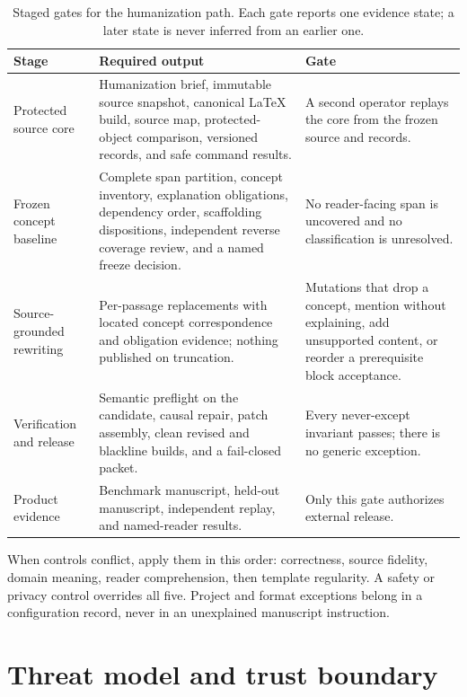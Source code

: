 \begin{table}[H]
\centering
\small
\begin{tabularx}{\textwidth}{@{}p{}L p{0.24\textwidth}@{}}
\toprule
Stage & Required output & Gate \\
\midrule
Protected source core & Humanization brief, immutable source snapshot, canonical
LaTeX build, source map, protected-object comparison, versioned records, and safe
command results. & A second operator replays the core from the frozen source and
records. \\
Frozen concept baseline & Complete span partition, concept inventory, explanation
obligations, dependency order, scaffolding dispositions, independent reverse
coverage review, and a named freeze decision. & No reader-facing span is
uncovered and no classification is unresolved. \\
Source-grounded rewriting & Per-passage replacements with located concept
correspondence and obligation evidence; nothing published on truncation. &
Mutations that drop a concept, mention without explaining, add unsupported
content, or reorder a prerequisite block acceptance. \\
Verification and release & Semantic preflight on the candidate, causal repair,
patch assembly, clean revised and blackline builds, and a fail-closed packet. &
Every never-except invariant passes; there is no generic exception. \\
Product evidence & Benchmark manuscript, held-out manuscript, independent replay,
and named-reader results. & Only this gate authorizes external release. \\
\bottomrule
\end{tabularx}
\caption{Staged gates for the humanization path. Each gate reports one evidence
state; a later state is never inferred from an earlier one.}
\label{tab:contract-scope}
\end{table}

When controls conflict, apply them in this order: correctness, source fidelity,
domain meaning, reader comprehension, then template regularity. A safety or
privacy control overrides all five. Project and format exceptions belong in a
configuration record, never in an unexplained manuscript instruction.

\section{Threat model and trust boundary}
\label{sec:contract-threat-model}

